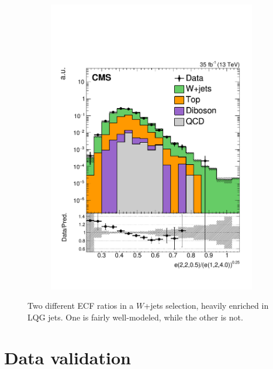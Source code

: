 \begin{figure}[]
\begin{center}
\begin{subfigure}[t]{0.32\textwidth}
            \includegraphics[width=\textwidth]{figures/toptagging/datamc/singlemuonw_ratio_22051240_logy.pdf}
        \end{subfigure}
        \caption{Two different ECF ratios in a $W$+jets selection, heavily enriched in LQG jets.
                 One is fairly well-modeled, while the other is not. }
        \label{fig:jets:datamc_ratios}
    \end{center}
\end{figure}

\section{Data validation}
\label{sec:jets:sf}
